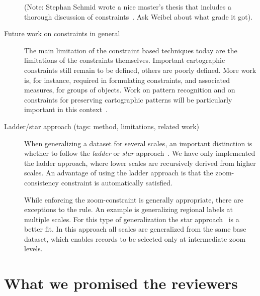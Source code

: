 \documentclass[11pt, oneside]{article}   	%
\begin{document}
\begin{description}
(Note: Stephan Schmid wrote a nice master's thesis that includes a thorough discussion of constraints~\cite{schmid2008automated}. Ask Weibel about what grade it got).

\item[Future work on constraints in general] The main limitation of the constraint based techniques today are the limitations of the constraints themselves. Important cartographic constraints still remain to be defined, others are poorly defined. More work is, for instance, required in formulating constraints, and associated measures, for groups of objects. Work on pattern recognition and on constraints for preserving cartographic patterns will be particularly important in this context~\cite{harrie2007modelling}.

\item[Ladder/star approach (tags: method, limitations, related work)] When generalizing a dataset for several scales, an important distinction is whether to follow the \emph{ladder} or \emph{star} approach~\cite{foerster2010challenges}. We have only implemented the ladder approach, where lower scales are recursively derived from higher scales. An advantage of using the ladder approach is that the zoom-consistency constraint is automatically satisfied. 

While enforcing the zoom-constraint is generally appropriate, there are exceptions to the rule. An example is generalizing regional labels at multiple scales. For this type of generalization the star approach~\cite{foerster2010challenges} is a better fit. In this approach all scales are generalized from the same base dataset, which enables records to be selected only at intermediate zoom levels.

\end{description}

\section{What we promised the reviewers}
\end{document}

